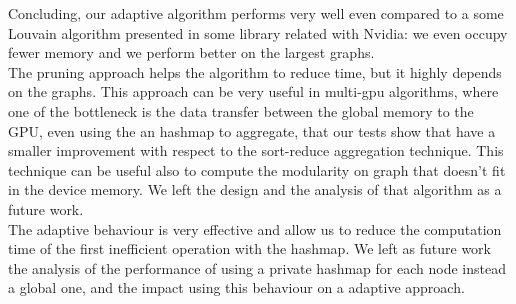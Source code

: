 Concluding, our adaptive algorithm performs very well even compared to a some Louvain algorithm presented in some library related with Nvidia: we even occupy fewer memory and we perform better on the largest graphs.\\ The pruning approach helps the algorithm to reduce time, but it highly depends on the graphs. This approach can be very useful in multi-gpu algorithms, where one of the bottleneck is the data transfer between the global memory to the GPU, even using the an hashmap to aggregate, that our tests show that have a smaller improvement with respect to the sort-reduce aggregation technique. This technique can be useful also to compute the modularity on graph that doesn't fit in the device memory. We left the design and the analysis of that algorithm as a future work. \\
The adaptive behaviour is very effective and allow us to reduce the computation time of the first inefficient operation with the hashmap. We left as future work the analysis of the performance of using a private hashmap for each node instead a global one, and the impact using this behaviour on a adaptive approach.
